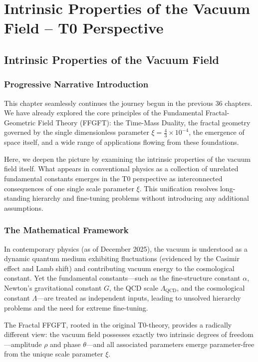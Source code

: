 \chapter{Intrinsic Properties of the Vacuum Field – T0 Perspective}


\section{Intrinsic Properties of the Vacuum Field}
	
	
	\subsection*{Progressive Narrative Introduction}
	
	This chapter seamlessly continues the journey begun in the previous 36 chapters. We have already explored the core principles of the Fundamental Fractal-Geometric Field Theory (FFGFT): the Time-Mass Duality, the fractal geometry governed by the single dimensionless parameter \(\xi = \frac{4}{3} \times 10^{-4}\), the emergence of space itself, and a wide range of applications flowing from these foundations.
	
	Here, we deepen the picture by examining the intrinsic properties of the vacuum field itself. What appears in conventional physics as a collection of unrelated fundamental constants emerges in the T0 perspective as interconnected consequences of one single scale parameter \(\xi\). This unification resolves long-standing hierarchy and fine-tuning problems without introducing any additional assumptions.
	
	\subsection*{The Mathematical Framework}
	
	In contemporary physics (as of December 2025), the vacuum is understood as a dynamic quantum medium exhibiting fluctuations (evidenced by the Casimir effect and Lamb shift) and contributing vacuum energy to the cosmological constant. Yet the fundamental constants—such as the fine-structure constant \(\alpha\), Newton's gravitational constant \(G\), the QCD scale \(\Lambda_{\text{QCD}}\), and the cosmological constant \(\Lambda\)—are treated as independent inputs, leading to unsolved hierarchy problems and the need for extreme fine-tuning.
	
	The Fractal FFGFT, rooted in the original T0-theory, provides a radically different view: the vacuum field possesses exactly two intrinsic degrees of freedom—amplitude \(\rho\) and phase \(\theta\)—and all associated parameters emerge parameter-free from the unique scale parameter \(\xi\).
	
